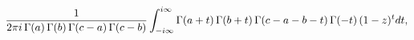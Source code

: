\[\frac{1}{2\pi i\mathop{\Gamma\/}\nolimits\!\left(a\right)\mathop{\Gamma\/}%
\nolimits\!\left(b\right)\mathop{\Gamma\/}\nolimits\!\left(c-a\right)\mathop{%
\Gamma\/}\nolimits\!\left(c-b\right)}\int_{-i\infty}^{i\infty}\mathop{\Gamma\/%
}\nolimits\!\left(a+t\right)\mathop{\Gamma\/}\nolimits\!\left(b+t\right)%
\mathop{\Gamma\/}\nolimits\!\left(c-a-b-t\right)\mathop{\Gamma\/}\nolimits\!%
\left(-t\right)(1-z)^{t}dt,\]